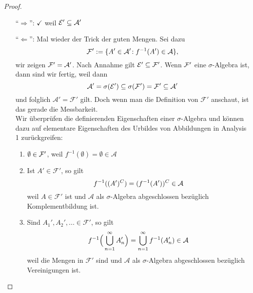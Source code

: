 \begin{proof}\label{messbErzeuger}\abs
	\begin{itemize}
		\item [\enquote{$\Rightarrow$}:] $\checkmark$ weil $\mathcal{E}' \subseteq \mathcal{A}'$
		\item [\enquote{$\Leftarrow$}:] Mal wieder der Trick der guten Mengen. Sei dazu \[ \mathcal{F}': = \{ A' \in \mathcal{A}' \! : f^{-1}(A') \in \mathcal{A} \}, \] wir zeigen $\mathcal{F}' = \mathcal{A}'$. Nach Annahme gilt $\mathcal{E}' \subseteq \mathcal{F}'$. Wenn $\mathcal{F}'$ eine $\sigma$-Algebra ist, dann sind wir fertig, weil dann
		\[ \mathcal{A}' = \sigma(\mathcal{E}') \subseteq \sigma(\mathcal{F}') = \mathcal{F}' \subseteq \mathcal{A}'\] 
		und folglich $\mathcal A'=\mathcal F'$ gilt. Doch wenn man die Definition von $\mathcal F'$ anschaut, ist das gerade die Messbarkeit.	\\
		
		Wir überprüfen die definierenden Eigenschaften einer $\sigma$-Algebra und k\"onnen dazu auf elementare Eigenschaften des Urbildes von Abbildungen in Analysis 1 zur\"uckgreifen:
		\begin{enumerate}[label=(\roman*)]
			\item $\emptyset \in \mathcal{F}'$, weil $f^{-1} (\emptyset) = \emptyset\in \mathcal A$
			\item Ist $A'\in \mathcal F'$, so gilt  \[f^{-1}((A')^C) = (f^{-1}(A'))^C \in \mathcal{A} \] weil $A\in \mathcal F'$ ist und $\mathcal A$ als $\sigma$-Algebra abgeschlossen bez\"uglich Komplementbildung ist.
			\item Sind $A_1', A_2', ... \in \mathcal F'$, so gilt  \[ f^{-1} \Big(\bigcup\limits_{n = 1}^{\infty} A'_n \Big) = \bigcup\limits_{n = 1}^{\infty} f^{-1}(A'_n) \in \mathcal{A}\] weil die Mengen in $\mathcal F'$ sind und $\mathcal A$ als $\sigma$-Algebra abgeschlossen bez\"uglich Vereinigungen ist.
		\end{enumerate}
	\end{itemize}
\end{proof}